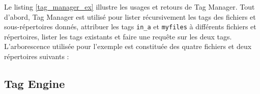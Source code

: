 Le listing \ref{tag_manager_ex} illustre les usages et retours de Tag Manager. Tout d'abord, Tag Manager est utilisé pour 
lister récursivement les tags des fichiers et sous-répertoires donnés, attribuer les tags \texttt{in_a} 
et \texttt{myfiles} à différents fichiers et répertoires, lister les tags existants et faire 
une requête sur les deux tags. L'arborescence utilisée pour l'exemple est constituée des quatre fichiers 
et deux répertoires suivants :
\bigbreak
{}
\bigbreak

\subsection{Tag Engine}\label{tag_engine_realisation}


